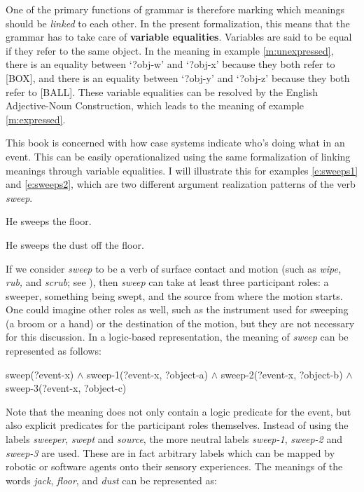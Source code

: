 One of the primary functions of grammar is therefore marking which meanings should be {\em linked} to each other. In the present formalization, this means that the grammar has to take care of {\bfseries variable equalities}. Variables are said to be equal if they refer to the same object. In the meaning in example \ref{m:unexpressed}, there is an equality between `?obj-w' and `?obj-x' because they both refer to [BOX], and there is an equality between `?obj-y' and `?obj-z' because they both refer to [BALL]. These variable equalities can be resolved by the English Adjective-Noun Construction, which leads to the meaning of example \ref{m:expressed}.

This book is concerned with how case systems indicate who's doing what in an event. This can be easily operationalized using the same formalization of linking meanings through variable equalities. I will illustrate this for examples \ref{e:sweeps1} and \ref{e:sweeps2}, which are two different argument realization patterns of the verb {\em sweep}.

\ea
\label{e:sweeps1}
He sweeps the floor.
\item 
\label{e:sweeps2}
He sweeps the dust off the floor.
\z

If we consider {\em sweep} to be a verb of surface contact and motion (such as {\em wipe, rub,} and {\em scrub}; see \citealp{levin99two}), then {\em sweep} can take at least three participant roles: a sweeper, something being swept, and the source from where the motion starts. One could imagine other roles as well, such as the instrument used for sweeping (a broom or a hand) or the destination of the motion, but they are not necessary for this discussion. In a logic-based representation, the meaning of {\em sweep} can be represented as follows:

\ea
sweep(?event-x) $\wedge$ sweep-1(?event-x, ?object-a) $\wedge$ sweep-2(?event-x, ?object-b) $\wedge$ sweep-3(?event-x, ?object-c)
\z

Note that the meaning does not only contain a logic predicate for the event, but also explicit predicates for the participant roles themselves. Instead of using the labels {\em sweeper}, {\em swept} and {\em source}, the more neutral labels {\em sweep-1}, {\em sweep-2} and {\em sweep-3} are used. These are in fact arbitrary labels which can be mapped by robotic or software agents onto their sensory experiences. The meanings of the words {\em jack}, {\em floor}, and {\em dust} can be represented as:

